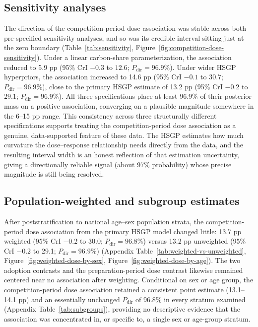 \subsection{Sensitivity analyses}
\label{sec:results-sensitivity}
The direction of the competition-period dose association was stable across both pre-specified sensitivity analyses, and so was its credible interval sitting just at the zero boundary (Table~\ref{tab:sensitivity}, Figure~\ref{fig:competition-dose-sensitivity}). Under a linear carbon-share parameterization, the association reduced to 5.9 pp (95\% CrI $-0.3$ to $12.6$; $P_{\mathrm{dir}}=96.9\%$). Under wider HSGP hyperpriors, the association increased to 14.6 pp (95\% CrI $-0.1$ to $30.7$; $P_{\mathrm{dir}}=96.9\%$), close to the primary HSGP estimate of 13.2 pp (95\% CrI $-0.2$ to $29.1$; $P_{\mathrm{dir}}=96.9\%$). All three specifications place at least 96.9\% of their posterior mass on a positive association, converging on a plausible magnitude somewhere in the 6--15 pp range. This consistency across three structurally different specifications supports treating the competition-period dose association as a genuine, data-supported feature of these data. The HSGP estimates how much curvature the dose--response relationship needs directly from the data, and the resulting interval width is an honest reflection of that estimation uncertainty, giving a directionally reliable signal (about 97\% probability) whose precise magnitude is still being resolved.

\subsection{Population-weighted and subgroup estimates}
\label{sec:results-weighted-subgroups}
After poststratification to national age--sex population strata, the competition-period dose association from the primary HSGP model changed little: 13.7 pp weighted (95\% CrI $-0.2$ to 30.0; $P_{\mathrm{dir}}=96.8\%$) versus 13.2 pp unweighted (95\% CrI $-0.2$ to 29.1; $P_{\mathrm{dir}}=96.9\%$) (Appendix Table~\ref{tab:weighted-vs-unweighted}, Figure~\ref{fig:weighted-dose-by-sex}, Figure~\ref{fig:weighted-dose-by-age}). The two adoption contrasts and the preparation-period dose contrast likewise remained centered near no association after weighting. Conditional on sex or age group, the competition-period dose association retained a consistent point estimate (13.1--14.1 pp) and an essentially unchanged $P_{\mathrm{dir}}$ of 96.8\% in every stratum examined (Appendix Table~\ref{tab:subgroups}), providing no descriptive evidence that the association was concentrated in, or specific to, a single sex or age-group stratum.

